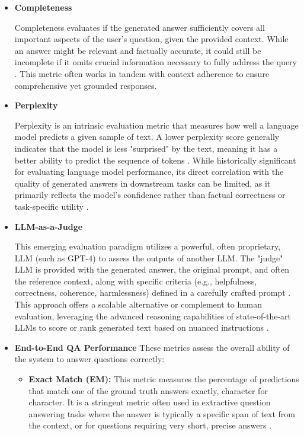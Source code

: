\documentclass[12pt]{report}
\begin{document}
\begin{itemize}
  \item \textbf{Completeness}

  Completeness evaluates if the generated answer sufficiently covers all important aspects of the user's question, given the provided context. While an answer might be relevant and factually accurate, it could still be incomplete if it omits crucial information necessary to fully address the query \cite{GalileoAI2024MetricsFirst}. This metric often works in tandem with context adherence to ensure comprehensive yet grounded responses.

  \item \textbf{Perplexity}

  Perplexity is an intrinsic evaluation metric that measures how well a language model predicts a given sample of text. A lower perplexity score generally indicates that the model is less "surprised" by the text, meaning it has a better ability to predict the sequence of tokens \cite{Comet2024Perplexity}. While historically significant for evaluating language model performance, its direct correlation with the quality of generated answers in downstream tasks can be limited, as it primarily reflects the model's confidence rather than factual correctness or task-specific utility \cite{AnalyticsVidhya2025Perplexity}.

  \item \textbf{LLM-as-a-Judge}

  This emerging evaluation paradigm utilizes a powerful, often proprietary, LLM (such as GPT-4) to assess the outputs of another LLM. The "judge" LLM is provided with the generated answer, the original prompt, and often the reference context, along with specific criteria (e.g., helpfulness, correctness, coherence, harmlessness) defined in a carefully crafted prompt \cite{Zheng2023JudgingLLM, ConfidentAI2025LLMJudgeExplained}. This approach offers a scalable alternative or complement to human evaluation, leveraging the advanced reasoning capabilities of state-of-the-art LLMs to score or rank generated text based on nuanced instructions \cite{ResearchGate2025SurveyLLMasJudge}.


  \item \textbf{End-to-End QA Performance}
    These metrics assess the overall ability of the system to answer questions correctly:

    \begin{itemize}
        \item \textbf{Exact Match (EM):} This metric measures the percentage of predictions that match one of the ground truth answers exactly, character for character. It is a stringent metric often used in extractive question answering tasks where the answer is typically a specific span of text from the context, or for questions requiring very short, precise answers \cite{Rajpurkar2016}.


\end{itemize}
\end{itemize}
\end{document}
